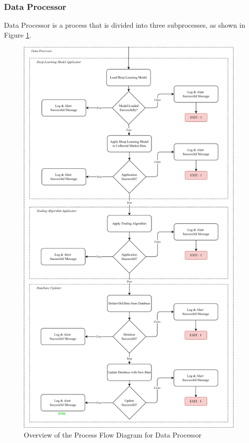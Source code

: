 \subsubsection{Data Processor}
\label{subsubsec:ml_application}
Data Processor is a process that is divided into three subprocesses, as shown in 
Figure \ref{fig:process_flowchart_data_processor}.
\begin{figure}[ht]
    \centering
    \includegraphics[height=0.72\textheight]{./assets/Chapter_3/PFC/ProcessFlowchart_DataProcessor.png}
    \caption{Overview of the Process Flow Diagram for Data Processor}
    \label{fig:process_flowchart_data_processor}
\end{figure}
\FloatBarrier

